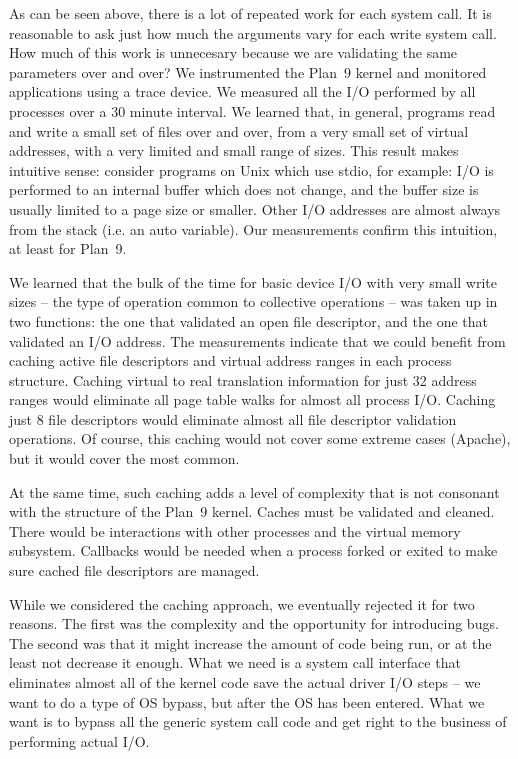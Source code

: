 \documentclass[letterpaper,twocolumn,10pt]{article}
\begin{document}
As can be seen above, there is a lot of repeated work for each system call. It is reasonable to ask just how much the arguments vary for each write system call. How much of this work is unnecesary because we are validating the same parameters over and over? 
We instrumented the Plan~9 kernel and monitored 
applications using  a trace device\cite{iwp9:tracedevice}. We measured all the I/O performed by all processes over 
a 30 minute interval. We learned that, in general, programs read and write a small 
set of files over and over, from a very small set of virtual addresses, with a very limited and small range of sizes. This result makes intuitive sense: consider programs on Unix which use stdio, 
for example: I/O is performed 
to an internal buffer which does not change, and the buffer size is usually limited to a page size or smaller. Other I/O addresses are almost always from the stack (i.e. an auto variable). Our measurements confirm this intuition, at least for Plan~9. 

We learned that the bulk of the time for basic device I/O with very small write sizes -- the type of operation common to collective operations -- was taken up in two functions: the one that validated an open file descriptor, and the one that validated an I/O address. 
The measurements indicate that we could benefit from caching active file descriptors and virtual address ranges in each process structure. Caching virtual to real translation information for just 32 address ranges would eliminate all page table walks for almost all process I/O. Caching just 8 file descriptors would eliminate almost all file descriptor validation operations. Of course, this caching would not cover some extreme cases (Apache), but it would cover the most common. 


At the same time, such caching adds a level of complexity that is not consonant with the structure of the Plan~9 kernel. Caches must be validated and cleaned. There would be interactions with other processes and the virtual memory subsystem. Callbacks would be needed when a process forked or exited to make sure cached file descriptors are managed. 

While we considered the caching approach, we eventually rejected it for two reasons. The first was the complexity and the opportunity for introducing bugs. The second was that it might increase the amount of code being run, or at the least not decrease it enough. What we need is a system call interface that eliminates almost all of the kernel code save the actual driver I/O steps -- we want to do a type of OS bypass, but after the OS has been entered. What we want is to bypass all the generic system call code and get right to the business of performing actual I/O. 
\end{document}
